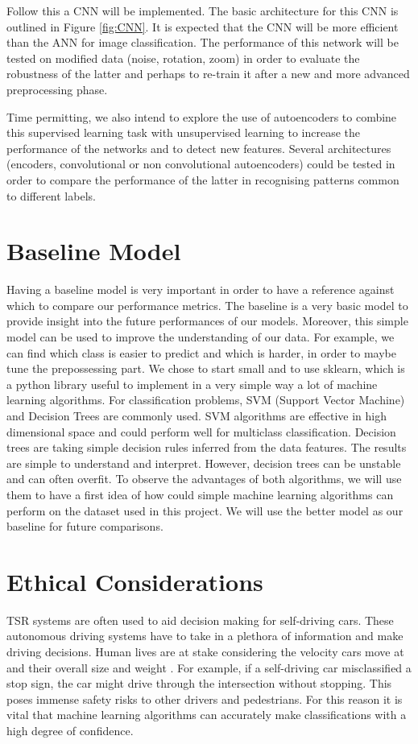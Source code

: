 \documentclass{article} %
\begin{document}
Follow this a CNN will be implemented. The basic architecture for this CNN is outlined in Figure \ref{fig:CNN}. It is expected that the CNN will be more efficient than the ANN for image classification. The performance of this network will be tested on modified data (noise, rotation, zoom) in order to evaluate the robustness of the latter and perhaps to re-train it after a new and more advanced preprocessing phase.


Time permitting, we also intend to explore the use of autoencoders to combine this supervised learning task with unsupervised learning to increase the performance of the networks and to detect new features. Several architectures (encoders, convolutional or non convolutional autoencoders) could be tested in order to compare the performance of the latter in recognising patterns common to different labels.



\section{Baseline Model}
Having a baseline model is very important in order to have a reference against which to compare our performance metrics. The baseline is a very basic model to provide insight into the future performances of our models. Moreover, this simple model can be used to improve the understanding of our data. For example, we can find which class is easier to predict and which is harder, in order to maybe tune the prepossessing part.
We chose to start small and to use sklearn, which is a python library useful to implement in a very simple way a lot of machine learning algorithms. For classification problems, SVM (Support Vector Machine) and Decision Trees are commonly used.
SVM algorithms are effective in high dimensional space and could perform well for multiclass classification.
Decision trees are taking simple decision rules inferred from the data features. The results are simple to understand and interpret. However, decision trees can be unstable and can often overfit.
To observe the advantages of both algorithms, we will use them to have a first idea of how could simple machine learning algorithms can perform on the dataset used in this project. We will use the better model as our baseline for future comparisons.

\section{Ethical Considerations}
TSR systems are often used to aid decision making for self-driving cars. These autonomous driving systems have to take in a plethora of information and make driving decisions. Human lives are at stake considering the velocity cars move at and their overall size and weight \citep{9498342}. For example, if a self-driving car misclassified a stop sign, the car might drive through the intersection without stopping. This poses immense safety risks to other drivers and pedestrians. For this reason it is vital that machine learning algorithms can accurately make classifications with a high degree of confidence. 
\end{document}
